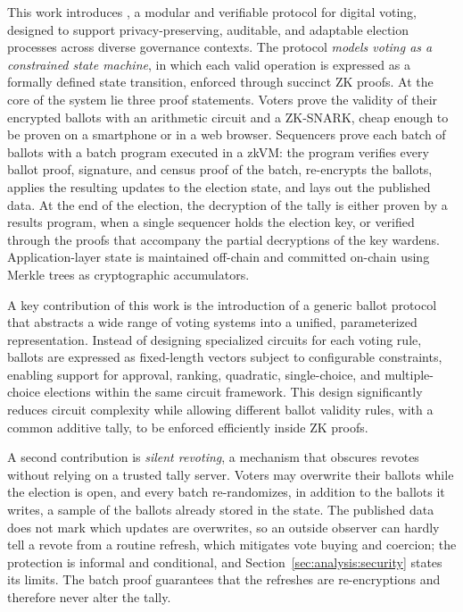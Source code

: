 This work introduces \davinci, a modular and verifiable protocol for digital voting, designed to support privacy-preserving, auditable, and adaptable election processes across diverse governance contexts. The protocol \textit{models voting as a constrained state machine}, in which each valid operation is expressed as a formally defined state transition, enforced through succinct \ac{ZK} proofs. At the core of the system lie three proof statements. Voters prove the validity of their encrypted ballots with an arithmetic circuit and a \ac{ZK-SNARK}, cheap enough to be proven on a smartphone or in a web browser. Sequencers prove each batch of ballots with a batch program executed in a \ac{zkVM}: the program verifies every ballot proof, signature, and census proof of the batch, re-encrypts the ballots, applies the resulting updates to the election state, and lays out the published data. At the end of the election, the decryption of the tally is either proven by a results program, when a single sequencer holds the election key, or verified through the proofs that accompany the partial decryptions of the key wardens. Application-layer state is maintained off-chain and committed on-chain using Merkle trees as cryptographic accumulators.

A key contribution of this work is the introduction of a generic ballot protocol that abstracts a wide range of voting systems into a unified, parameterized representation. Instead of designing specialized circuits for each voting rule, ballots are expressed as fixed-length vectors subject to configurable constraints, enabling support for approval, ranking, quadratic, single-choice, and multiple-choice elections within the same circuit framework. This design significantly reduces circuit complexity while allowing different ballot validity rules, with a common additive tally, to be enforced efficiently inside \ac{ZK} proofs.

A second contribution is \textit{silent revoting}, a mechanism that obscures revotes without relying on a trusted tally server. Voters may overwrite their ballots while the election is open, and every batch re-randomizes, in addition to the ballots it writes, a sample of the ballots already stored in the state. The published data does not mark which updates are overwrites, so an outside observer can hardly tell a revote from a routine refresh, which mitigates vote buying and coercion; the protection is informal and conditional, and Section~\ref{sec:analysis:security} states its limits. The batch proof guarantees that the refreshes are re-encryptions and therefore never alter the tally.

